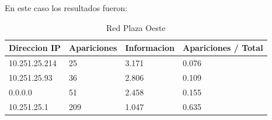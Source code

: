 En este caso los resultados fueron:


\begin{table}[H]
\centering
\caption{Red Plaza Oeste}
\label{my-label}
\begin{tabular}{@{}llll@{}}
\toprule
Direccion IP  & Apariciones & Informacion & Apariciones / Total \\ \midrule
10.251.25.214 & 25          & 3.171       & 0.076               \\
10.251.25.93  & 36          & 2.806       & 0.109               \\
0.0.0.0       & 51          & 2.458       & 0.155               \\
10.251.25.1   & 209         & 1.047       & 0.635              
\end{tabular}
\end{table}


